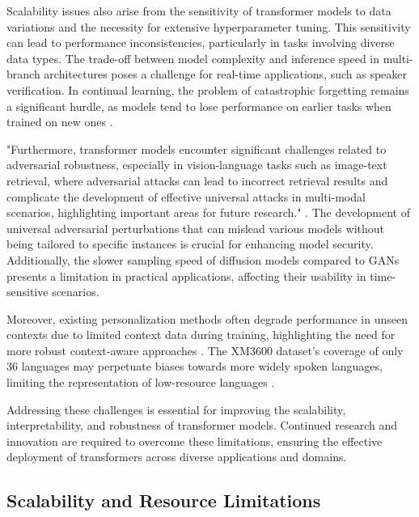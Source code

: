 Scalability issues also arise from the sensitivity of transformer models to data variations and the necessity for extensive hyperparameter tuning. This sensitivity can lead to performance inconsistencies, particularly in tasks involving diverse data types. The trade-off between model complexity and inference speed in multi-branch architectures poses a challenge for real-time applications, such as speaker verification. In continual learning, the problem of catastrophic forgetting remains a significant hurdle, as models tend to lose performance on earlier tasks when trained on new ones \cite{goldfarb2022analysiscatastrophicforgettingrandom}.



"Furthermore, transformer models encounter significant challenges related to adversarial robustness, especially in vision-language tasks such as image-text retrieval, where adversarial attacks can lead to incorrect retrieval results and complicate the development of effective universal attacks in multi-modal scenarios, highlighting important areas for future research." \cite{zhang2024universaladversarialperturbationsvisionlanguage}. The development of universal adversarial perturbations that can mislead various models without being tailored to specific instances is crucial for enhancing model security. Additionally, the slower sampling speed of diffusion models compared to GANs presents a limitation in practical applications, affecting their usability in time-sensitive scenarios.



Moreover, existing personalization methods often degrade performance in unseen contexts due to limited context data during training, highlighting the need for more robust context-aware approaches \cite{kaur2024cropcontextwiserobuststatic}. The XM3600 dataset's coverage of only 36 languages may perpetuate biases towards more widely spoken languages, limiting the representation of low-resource languages \cite{thapliyal2022crossmodal3600massivelymultilingualmultimodal}.



Addressing these challenges is essential for improving the scalability, interpretability, and robustness of transformer models. Continued research and innovation are required to overcome these limitations, ensuring the effective deployment of transformers across diverse applications and domains.



\subsection{Scalability and Resource Limitations} \label{subsec:Scalability and Resource Limitations}

